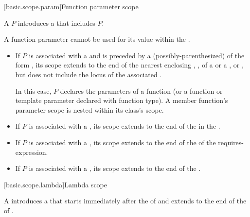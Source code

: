 [basic.scope.param]{Function parameter scope}

%
%

\pnum
A  $P$ introduces
a  that includes $P$.
\begin{note}
A function parameter cannot be used for its value
within the .
\end{note}
\begin{itemize}
\item
If $P$ is associated with a  and
is preceded by a (possibly-parenthesized)  of
the form
 ,
its scope extends to the end of the nearest enclosing
,
,
 of a  or
a , or
,
but does not include the locus of the associated .
\begin{note}
In this case, $P$ declares the parameters of a function
(or a function or template parameter declared with function type).
A member function's parameter scope is nested within its class's scope.
\end{note}
\item
If $P$ is associated with a ,
its scope extends to the end of the 
in the .
\item
If $P$ is associated with a ,
its scope extends to the end of the  of the requires-expression.
\item
If $P$ is associated with a ,
its scope extends to the end of the .
\end{itemize}

[basic.scope.lambda]{Lambda scope}

A   introduces a 
that starts immediately after the  of 
and extends to the end of the  of .

